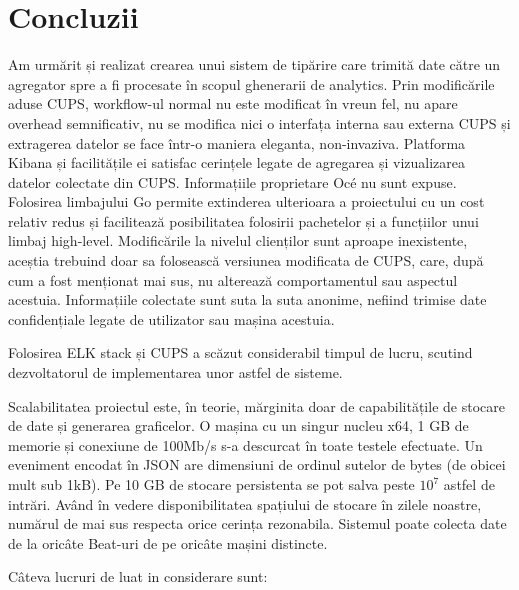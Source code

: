 \documentclass[a4paper, 12pt, twoside]{report}
\begin{document}
{\chapter{Concluzii}
Am urmărit și realizat crearea unui sistem de tipărire care trimită date către un agregator spre a fi procesate în scopul ghenerarii de analytics. Prin modificările aduse CUPS, workflow-ul normal nu este modificat în vreun fel, nu apare overhead semnificativ, nu se modifica nici o interfața interna sau externa CUPS și extragerea datelor se face într-o maniera eleganta, non-invaziva. Platforma Kibana și facilitățile ei satisfac cerințele legate de agregarea și vizualizarea datelor colectate din CUPS. Informațiile proprietare Océ nu sunt expuse. Folosirea limbajului Go permite extinderea ulterioara a proiectului cu un cost relativ redus și facilitează posibilitatea folosirii pachetelor și a funcțiilor unui limbaj high-level. Modificările la nivelul clienților sunt aproape inexistente, aceștia trebuind doar sa folosească versiunea modificata de CUPS, care, după cum a fost menționat mai sus, nu alterează comportamentul sau aspectul acestuia. Informațiile colectate sunt suta la suta anonime, nefiind trimise date confidențiale legate de utilizator sau mașina acestuia.

Folosirea ELK stack și CUPS a scăzut considerabil timpul de lucru, scutind dezvoltatorul de implementarea unor astfel de sisteme.

Scalabilitatea proiectul este, în teorie, mărginita doar de capabilitățile de stocare de date și generarea graficelor. O mașina cu un singur nucleu x64, 1 GB de memorie și conexiune de 100Mb/s s-a descurcat în toate testele efectuate. Un eveniment encodat în JSON are dimensiuni de ordinul sutelor de bytes (de obicei mult sub 1kB). Pe 10 GB de stocare persistenta se pot salva peste \begin{math} 10^7 \end{math} astfel de intrări. Având în vedere disponibilitatea spațiului de stocare în zilele noastre, numărul de mai sus respecta orice cerința rezonabila. Sistemul poate colecta date de la oricâte Beat-uri de pe oricâte mașini distincte.

\bigskip

Câteva lucruri de luat in considerare sunt:

}
\end{document}
